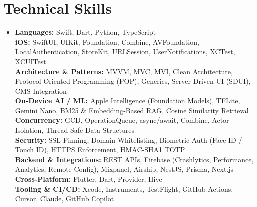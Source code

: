 \documentclass[letterpaper,11pt]{article}
\begin{document}
\section{Technical Skills}
\begin{itemize}[leftmargin=0.12in, label={}, topsep=1pt, itemsep=1pt, parsep=0pt]
  \item{
    \textbf{Languages:} Swift, Dart, Python, TypeScript \\[1pt]
    \textbf{iOS:} SwiftUI, UIKit, Foundation, Combine, AVFoundation, LocalAuthentication, StoreKit, URLSession, UserNotifications, XCTest, XCUITest \\[1pt]
    \textbf{Architecture \& Patterns:} MVVM, MVC, MVI, Clean Architecture, Protocol-Oriented Programming (POP), Generics, Server-Driven UI (SDUI), CMS Integration \\[1pt]
    \textbf{On-Device AI / ML:} Apple Intelligence (Foundation Models), TFLite, Gemini Nano, BM25 \& Embedding-Based RAG, Cosine Similarity Retrieval \\[1pt]
    \textbf{Concurrency:} GCD, OperationQueue, async/await, Combine, Actor Isolation, Thread-Safe Data Structures \\[1pt]
    \textbf{Security:} SSL Pinning, Domain Whitelisting, Biometric Auth (Face ID / Touch ID), HTTPS Enforcement, HMAC-SHA1 TOTP \\[1pt]
    \textbf{Backend \& Integrations:} REST APIs, Firebase (Crashlytics, Performance, Analytics, Remote Config), Mixpanel, Airship, NestJS, Prisma, Next.js \\[1pt]
    \textbf{Cross-Platform:} Flutter, Dart, Provider, Hive  \\[1pt]
    \textbf{Tooling \& CI/CD:} Xcode, Instruments, TestFlight, GitHub Actions, Cursor, Claude, GitHub Copilot
  }
\end{itemize}
\end{document}
